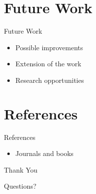 \documentclass{beamer}
\begin{document}
\section{Future Work}

\begin{frame}{Future Work}
\begin{itemize}
\item Possible improvements
\item Extension of the work
\item Research opportunities
\end{itemize}
\end{frame}

\section{References}

\begin{frame}{References}
\begin{itemize}
\item Journals and books
\end{itemize}
\end{frame}

\begin{frame}
\centerline{\Large Thank You}
\centerline{Questions?}
\end{frame}

\end{document}
